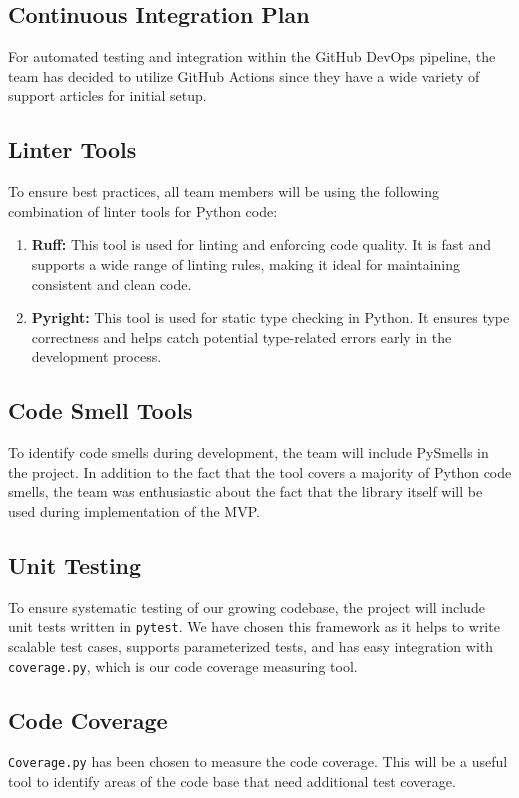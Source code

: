 \documentclass{article}
\begin{document}
\subsection{Continuous Integration Plan}
For automated testing and integration within the GitHub DevOps pipeline, the team has decided to utilize GitHub Actions since they have a wide variety of support articles for initial setup.

\subsection{Linter Tools}
To ensure best practices, all team members will be using the
following combination of linter tools for Python code:
\begin{enumerate}
  \item \textbf{Ruff:} This tool is used for linting and enforcing code quality. It is fast and supports a wide range of linting rules, making it ideal for maintaining consistent and clean code.
  \item \textbf{Pyright:} This tool is used for static type checking in Python. It ensures type correctness and helps catch potential type-related errors early in the development process.
\end{enumerate}


\subsection{Code Smell Tools}
To identify code smells during development, the team will include
PySmells in the project. In addition to the fact that the tool covers
a majority of Python code smells, the team was enthusiastic about the
fact that the library itself will be used during implementation of the MVP.

\subsection{Unit Testing}
To ensure systematic testing of our growing codebase, the project
will include unit tests written in \texttt{pytest}. We have chosen
this framework as it helps to write scalable test cases, supports
parameterized tests, and has easy integration with
\texttt{coverage.py}, which is our code coverage measuring tool.

\subsection{Code Coverage}
\texttt{Coverage.py} has been chosen to measure the code coverage.
This will be a useful tool to identify areas of the code base that
need additional test coverage.
\end{document}
